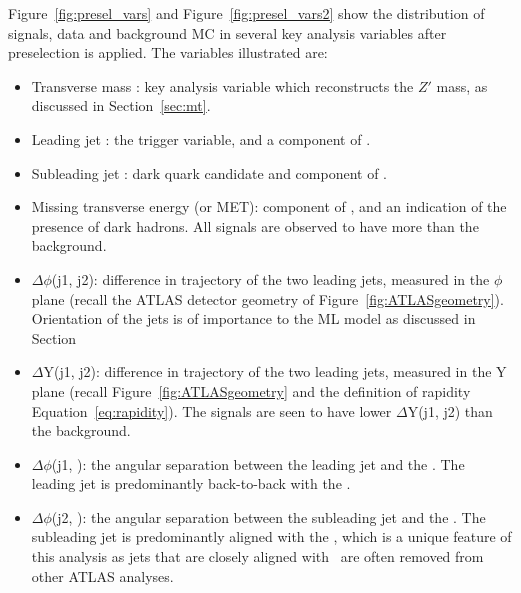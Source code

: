 Figure~\ref{fig:presel_vars} and Figure~\ref{fig:presel_vars2} show the distribution of signals, data and background MC in several key analysis variables after preselection is applied.
The variables illustrated are:
\begin{itemize}
\item Transverse mass \mt: key analysis variable which reconstructs the $Z'$ mass, as discussed in Section~\ref{sec:mt}.
\item Leading jet \pt: the trigger variable, and a component of \mt. 
\item Subleading jet \pt: dark quark candidate and component of \mt.
\item Missing transverse energy \met (or MET): component of \mt, and an indication of the presence of dark hadrons. All signals are observed to have more \met than the background.
\item $\Delta\phi$(j1, j2): difference in trajectory of the two leading jets, measured in the $\phi$ plane (recall the ATLAS detector geometry of Figure~\ref{fig:ATLASgeometry}). Orientation of the jets is of importance to the ML model as discussed in Section
\item $\Delta$Y(j1, j2): difference in trajectory of the two leading jets, measured in the Y plane (recall Figure~\ref{fig:ATLASgeometry} and the definition of rapidity Equation~\ref{eq:rapidity}). The signals are seen to have lower $\Delta$Y(j1, j2) than the background.
\item $\Delta\phi$(j1, \met): the angular separation between the leading jet and the \met. The leading jet is predominantly back-to-back with the \met.
\item $\Delta\phi$(j2, \met): the angular separation between the subleading jet and the \met. The subleading jet is predominantly aligned with the \met, which is a unique feature of this analysis as jets that are closely aligned with \met~are often removed from other ATLAS analyses.
\end{itemize}

